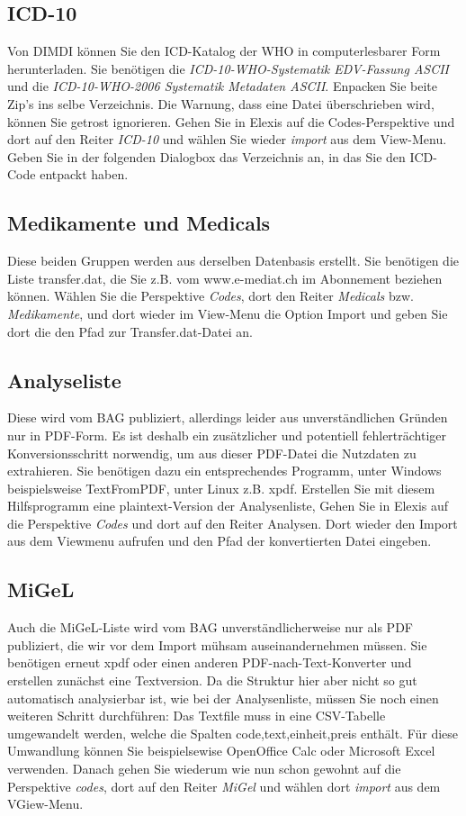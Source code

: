 \subsection{ICD-10}
Von DIMDI können Sie den ICD-Katalog der WHO in computerlesbarer Form herunterladen. Sie benötigen die \textit{ICD-10-WHO-Systematik EDV-Fassung ASCII} und die \textit{ICD-10-WHO-2006 Systematik Metadaten ASCII}. Enpacken Sie beite Zip's ins selbe Verzeichnis. Die Warnung, dass eine Datei überschrieben wird, können Sie getrost ignorieren. Gehen Sie in Elexis auf die Codes-Perspektive und dort auf den Reiter \textit{ICD-10} und wählen Sie wieder \textit{import} aus dem View-Menu. Geben Sie in der folgenden Dialogbox das Verzeichnis an, in das Sie den ICD-Code entpackt haben.
\subsection{Medikamente und Medicals}
Diese beiden Gruppen werden aus derselben Datenbasis erstellt. Sie benötigen die Liste transfer.dat, die Sie z.B. vom www.e-mediat.ch im Abonnement beziehen können. Wählen Sie die Perspektive \textit{Codes}, dort den Reiter \textit{Medicals} bzw. \textit{Medikamente}, und dort wieder im View-Menu die Option Import und geben Sie dort die den Pfad zur Transfer.dat-Datei an.
\subsection{Analyseliste}
Diese wird vom BAG publiziert, allerdings leider aus unverständlichen Gründen nur in PDF-Form. Es ist deshalb ein zusätzlicher und potentiell fehlerträchtiger Konversionsschritt norwendig, um aus dieser PDF-Datei die Nutzdaten zu extrahieren. Sie benötigen dazu ein entsprechendes Programm, unter Windows beispielsweise TextFromPDF, unter Linux z.B. xpdf. Erstellen Sie mit diesem Hilfsprogramm eine plaintext-Version der Analysenliste, Gehen Sie in Elexis auf die Perspektive \textit{Codes} und dort auf den Reiter Analysen. Dort wieder den Import aus dem Viewmenu aufrufen und den Pfad der konvertierten Datei eingeben.
\subsection{MiGeL}
Auch die MiGeL-Liste wird vom BAG unverständlicherweise nur als PDF publiziert, die wir vor dem Import mühsam auseinandernehmen müssen. Sie benötigen erneut xpdf oder einen anderen PDF-nach-Text-Konverter und erstellen zunächst eine Textversion. Da die Struktur hier aber nicht so gut automatisch analysierbar ist, wie bei der Analysenliste, müssen Sie noch einen weiteren Schritt durchführen: Das Textfile muss in eine CSV-Tabelle umgewandelt werden, welche die Spalten code,text,einheit,preis enthält. Für diese Umwandlung können Sie beispielsewise OpenOffice Calc oder Microsoft Excel verwenden. Danach gehen Sie wiederum wie nun schon gewohnt auf die Perspektive \textit{codes}, dort auf den Reiter \textit{MiGel} und wählen dort \textit{import} aus dem VGiew-Menu.

